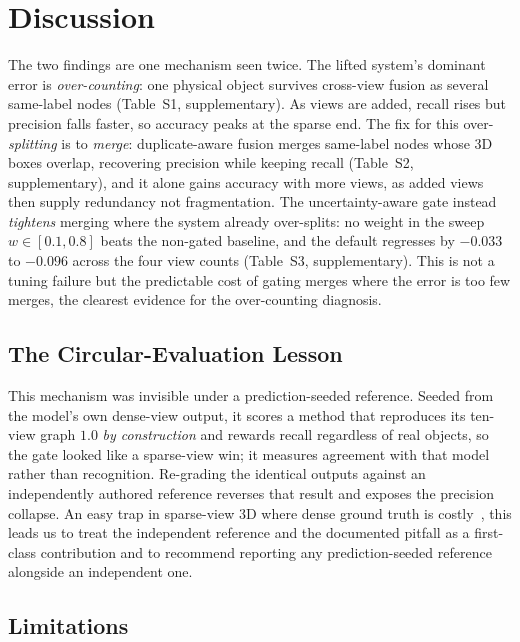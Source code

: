 \section{Discussion}
\label{sec:discussion}

The two findings are one mechanism seen twice. The lifted system's dominant error is
\emph{over-counting}: one physical object survives cross-view fusion as several same-label nodes
(Table~S1, supplementary). As views are added, recall rises but precision falls faster, so accuracy
peaks at the sparse end. The fix for this over-\emph{splitting} is to \emph{merge}: duplicate-aware
fusion merges same-label nodes whose 3D boxes overlap, recovering precision while keeping recall
(Table~S2, supplementary), and it alone gains accuracy with more views, as added views then supply
redundancy not fragmentation. The uncertainty-aware gate instead \emph{tightens} merging where the system
already over-splits: no weight in the sweep $w\in[0.1,0.8]$ beats the non-gated baseline, and the default
regresses by $-0.033$ to $-0.096$ across the four view counts (Table~S3, supplementary). This is
not a tuning failure but the predictable cost of gating merges where the error is too few merges, the
clearest evidence for the over-counting diagnosis.

\subsection{The Circular-Evaluation Lesson}
\label{sec:disc-circularity}

This mechanism was invisible under a prediction-seeded reference. Seeded from the model's own dense-view
output, it scores a method that reproduces its ten-view graph $1.0$ \emph{by construction} and rewards
recall regardless of real objects, so the gate looked like a sparse-view win; it measures agreement with
that model rather than recognition. Re-grading the identical outputs
against an independently authored reference reverses that result and exposes the precision collapse. An
easy trap in sparse-view 3D where dense ground truth is
costly~\cite{gundersen2018reproducibility,kapoor2023leakage}, this leads us to treat the independent
reference and the documented pitfall as a first-class contribution and to recommend reporting any
prediction-seeded reference alongside an independent one.

\subsection{Limitations}
\label{sec:disc-limitations}


